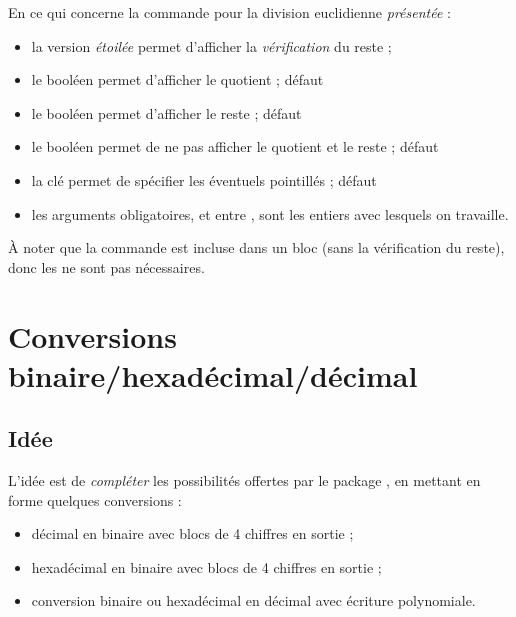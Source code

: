 \begin{cautionblock}
En ce qui concerne la commande pour la division euclidienne \textit{présentée} :

\begin{itemize}
	\item la version \textit{étoilée} permet d'afficher la \textit{vérification} du reste ;
	\item le booléen  permet d'afficher le quotient ; \hfill{}défaut 
	\item le booléen  permet d'afficher le reste ; \hfill{}défaut 
	\item le booléen  permet de ne pas afficher le quotient et le reste ; \hfill{}défaut 
	\item la clé  permet de spécifier les éventuels pointillés ; \hfill{}défaut 
	\item les arguments obligatoires, et entre , sont les entiers avec lesquels on travaille.
\end{itemize}

À noter que la commande est incluse dans un bloc  (sans la vérification du reste), donc les  ne sont pas nécessaires.
\end{cautionblock}

\begin{PresCodePL}{}
\par
{}
\end{PresCodePL}

\pagebreak

\section{Conversions binaire/hexadécimal/décimal}\label{conversions}

\subsection{Idée}

\begin{tipblock}
L'idée est de \textit{compléter} les possibilités offertes par le package , en mettant en forme quelques conversions :

\begin{itemize}
	\item décimal en binaire avec blocs de 4 chiffres en sortie ;
	\item hexadécimal en binaire avec blocs de 4 chiffres en sortie ;
	\item conversion binaire ou hexadécimal en décimal avec écriture polynomiale.
\end{itemize}
\vspace*{-\baselineskip}\leavevmode
\end{tipblock}

